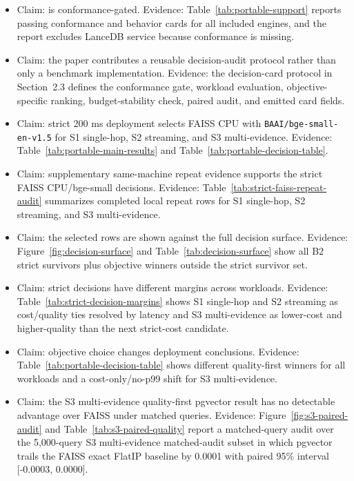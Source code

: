 \begin{itemize}[leftmargin=*]
  \item Claim: \sys is conformance-gated. Evidence: Table~\ref{tab:portable-support} reports passing conformance and behavior cards for all included engines, and the report excludes LanceDB service because conformance is missing.
  \item Claim: the paper contributes a reusable decision-audit protocol rather than only a benchmark implementation. Evidence: the decision-card protocol in Section~2.3 defines the conformance gate, workload evaluation, objective-specific ranking, budget-stability check, paired audit, and emitted card fields.
  \item Claim: strict 200 ms \maxrowp{} deployment selects FAISS CPU with \texttt{BAAI/bge-small-en-v1.5} for S1 single-hop, S2 streaming, and S3 multi-evidence. Evidence: Table~\ref{tab:portable-main-results} and Table~\ref{tab:portable-decision-table}.
  \item Claim: supplementary same-machine repeat evidence supports the strict FAISS CPU/bge-small decisions. Evidence: Table~\ref{tab:strict-faiss-repeat-audit} summarizes completed local repeat rows for S1 single-hop, S2 streaming, and S3 multi-evidence.
  \item Claim: the selected rows are shown against the full decision surface. Evidence: Figure~\ref{fig:decision-surface} and Table~\ref{tab:decision-surface} show all B2 strict survivors plus objective winners outside the strict survivor set.
  \item Claim: strict decisions have different margins across workloads. Evidence: Table~\ref{tab:strict-decision-margins} shows S1 single-hop and S2 streaming as cost/quality ties resolved by latency and S3 multi-evidence as lower-cost and higher-quality than the next strict-cost candidate.
  \item Claim: objective choice changes deployment conclusions. Evidence: Table~\ref{tab:portable-decision-table} shows different quality-first winners for all workloads and a cost-only/no-p99 shift for S3 multi-evidence.
  \item Claim: the S3 multi-evidence quality-first pgvector result has no detectable advantage over FAISS under matched queries. Evidence: Figure~\ref{fig:s3-paired-audit} and Table~\ref{tab:s3-paired-quality} report a matched-query audit over the 5{,}000-query S3 multi-evidence matched-audit subset in which pgvector trails the FAISS exact FlatIP baseline by 0.0001 \ecov{} with paired 95\% interval [-0.0003, 0.0000].

\end{itemize}
